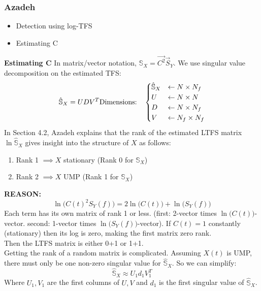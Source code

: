 \documentclass{article}
\begin{document}
\subsubsection{Azadeh}
\begin{itemize}
    \item Detection using log-TFS
    \item Estimating C \\
\end{itemize}

{\color{redd}\textbf{Estimating C}
In matrix/vector notation, $\mathbb S_X = \vec {C^2} \vec S_Y$. 
We use singular value decomposition on the estimated TFS:
\[
\hat {\mathbb S}_X = UDV^T \\\;\\
\text{Dimensions:}\quad
\begin{cases}
    \hat {\mathbb S}_X &\leftarrow N\times N_f \\
    U &\leftarrow N\times N \\
    D &\leftarrow N\times N_f \\
    V &\leftarrow N_f \times N_f
\end{cases}
\]
In Section 4.2, Azadeh explains that the rank of the estimated LTFS matrix $\ln\hat{\mathbb S}_X$ 
gives insight into the structure of $X$ as follows:
\begin{enumerate}
    \item Rank 1 $\implies X$ stationary (Rank 0 for $\mathbb S_X$)
    \item Rank 2 $\implies X$ UMP (Rank 1 for $\mathbb S_X$)\\
\end{enumerate}

\textbf{REASON: }
\[\ln \Big(C(t)^2S_Y(f)\Big) = 2\ln\big(C(t)\big) + \ln\big(S_Y(f)\big)\]
Each term has its own matrix of rank 1 or less. (first: 2-vector times $\ln\big(C(t)\big)$-vector. 
second: 1-vector times $\ln\big(S_Y(f)\big)$-vector). 
If $C(t) = 1$ constantly (stationary) then its log is zero, making the first matrix zero rank.\\
Then the LTFS matrix is either 0+1 or 1+1.\\

Getting the rank of a random matrix is complicated.
Assuming $X(t)$ is UMP, there must only be one non-zero singular value for $\hat {\mathbb S}_X$. So we can simplify:
\[\hat {\mathbb S}_X \approx U_1 d_1 V_1^T\]
Where $U_1, V_1$ are the first columns of $U,V$ and $d_1$ is the first singular value of $\hat{\mathbb S}_X$.\\

}
\end{document}
